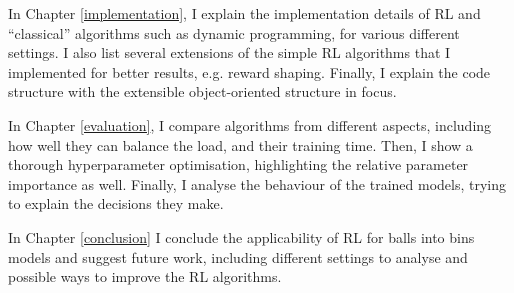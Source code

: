 In Chapter \ref{implementation}, I explain the implementation details of RL and ``classical'' algorithms such as dynamic programming, for various different settings. I also list several extensions of the simple RL algorithms that I implemented for better results, e.g. reward shaping. Finally, I explain the code structure with the extensible object-oriented structure in focus.


In Chapter \ref{evaluation}, I compare algorithms from different aspects, including how well they can balance the load, and their training time. Then, I show a thorough hyperparameter optimisation, highlighting the relative parameter importance as well. Finally, I analyse the behaviour of the trained models, trying to explain the decisions they make.


In Chapter \ref{conclusion} I conclude the applicability of RL for balls into bins models and suggest future work, including different settings to analyse and possible ways to improve the RL algorithms.